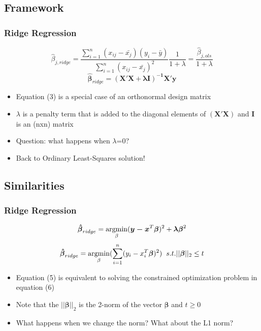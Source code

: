 \documentclass[]{beamer}
\newcommand{\argmin}{\operatornamewithlimits{argmin}}
\begin{document}
\subsection{Framework}
\begin{frame}
	\frametitle{Ridge Regression}   %

	\begin{equation}
		\hat{\beta}_{j,ridge} = \frac{\sum_{i=1}^{n} (x_{ij} - \bar{x_j})(y_i - \bar{y})} {\sum_{i=1}^{n} (x_{ij} - \bar{x_j})^2} \frac{1}{1+\lambda} = \frac{\hat{\beta}_{j,ols}} {1 + 	\lambda}
\end{equation}
\begin{equation}
	\boldsymbol{\hat{\beta}}_{ridge} = \boldsymbol{ (X'X+\lambda I)^{-1} X'y}
\end{equation}
\begin{itemize}
		\item<1-> Equation (3) is a special case of an orthonormal design matrix 
		\item<2-> $\lambda$ is a penalty term that is added to the diagonal elements of $\boldsymbol{(X'X)}$ and $\boldsymbol{I}$ is an (nxn) matrix
		\item<3-> Question: what happens when $\lambda$=0?
		\item<4-> Back to Ordinary Least-Squares solution!
	\end{itemize}
\end{frame}

\subsection{Similarities}
\begin{frame}
\frametitle{Ridge Regression}   %
\begin{equation}
\boldsymbol{\hat{\beta}}_{ridge} = \argmin_{\beta} (\boldsymbol{y - x}^{T} \boldsymbol{\beta})^2 + \boldsymbol{\lambda \beta}^2
\end{equation}
\begin{equation}
\boldsymbol{\hat{\beta}}_{ridge} = \argmin_{\beta}( \sum_{i=1}^{n} (y_i-x_{i}^T \boldsymbol{\beta})^2) \hspace{0.2cm} s.t. ||\boldsymbol{\beta}||_2 \le t
\end{equation}
\begin{itemize}
\item<1-> Equation (5) is equivalent to solving the constrained optimization problem in equation (6)
\item<2-> Note that the $||\boldsymbol{\beta}||_2$ is the 2-norm of the vector $\boldsymbol{\beta}$ and $t \ge 0$
  \item<3-> What happens when we change the norm? What about the L1 norm?
\end{itemize}
\end{frame}
\end{document}
